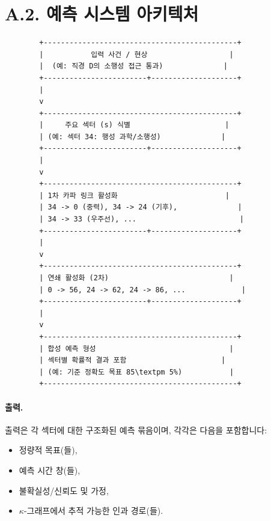\documentclass[13pt,a4paper]{article}
\begin{document}
	\section*{A.2. 예측 시스템 아키텍처}
	
	\begin{lstlisting}
		+---------------------------------------------+
		|           입력 사건 / 현상                   |
		|  (예: 직경 D의 소행성 접근 통과)              |
		+------------------------+--------------------+
		|
		v
		+---------------------------------------------+
		|     주요 섹터 (s) 식별                      |
		| (예: 섹터 34: 행성 과학/소행성)              |
		+------------------------+--------------------+
		|
		v
		+---------------------------------------------+
		| 1차 카파 링크 활성화                         |
		| 34 -> 0 (중력), 34 -> 24 (기후),              |
		| 34 -> 33 (우주선), ...                        |
		+------------------------+--------------------+
		|
		v
		+---------------------------------------------+
		| 연쇄 활성화 (2차)                            |
		| 0 -> 56, 24 -> 62, 24 -> 86, ...             |
		+------------------------+--------------------+
		|
		v
		+---------------------------------------------+
		| 합성 예측 형성                               |
		| 섹터별 확률적 결과 포함                      |
		| (예: 기준 정확도 목표 85\textpm 5%)           |
		+---------------------------------------------+
	\end{lstlisting}
	
	\paragraph{출력.}
	출력은 각 섹터에 대한 구조화된 예측 묶음이며, 각각은 다음을 포함합니다:
	\begin{itemize}[leftmargin=*]
		\item 정량적 목표(들),
		\item 예측 시간 창(들),
		\item 불확실성/신뢰도 및 가정,
		\item $\kappa$-그래프에서 추적 가능한 인과 경로(들).
	\end{itemize}
	
\end{document}
